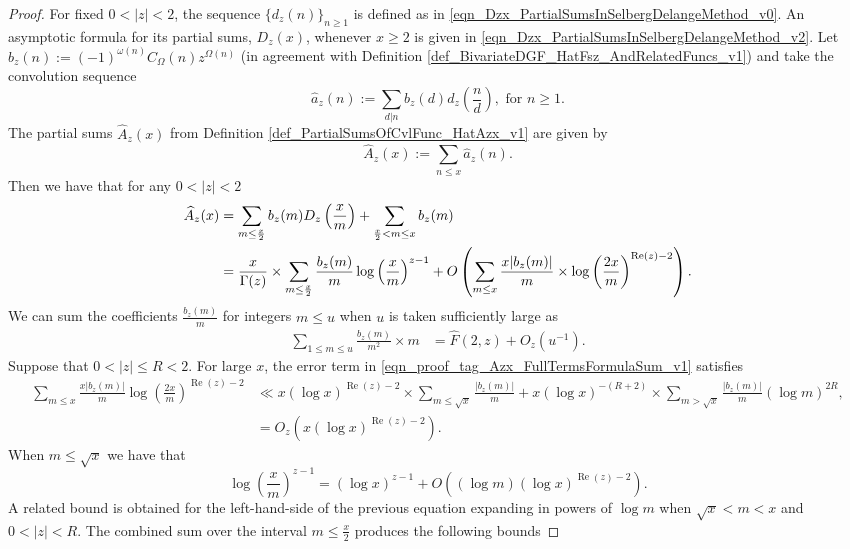 \documentclass[11pt,reqno,a4letter]{article}
\newcommand{\hlocalref}[1]{\hyperref[#1]{\ref{#1}}}
\numberwithin{equation}{section}
\numberwithin{figure}{section}
\numberwithin{table}{section}
\theoremstyle{plain}
\numberwithin{theorem}{section}
\theoremstyle{definition}
\renewcommand{\Re}{\operatorname{Re}}
\begin{document}
\begin{proof}
For fixed $0 < |z| < 2$, the sequence $\{d_z(n)\}_{n \geq 1}$ 
is defined as in \eqref{eqn_Dzx_PartialSumsInSelbergDelangeMethod_v0}. 
An asymptotic formula for its partial sums, $D_z(x)$, whenever $x \geq 2$ is given in 
\eqref{eqn_Dzx_PartialSumsInSelbergDelangeMethod_v2}. 
Let $b_z(n) := (-1)^{\omega(n)} C_{\Omega}(n) z^{\Omega(n)}$ (in agreement with 
Definition \hlocalref{def_BivariateDGF_HatFsz_AndRelatedFuncs_v1}) and  
take the convolution sequence 
$$\hat{a}_z(n) := \sum\limits_{d|n} b_z(d) d_z\left(\frac{n}{d}\right), \text{ for } n \geq 1.$$  
The partial sums $\widehat{A}_z(x)$ from 
Definition \hlocalref{def_PartialSumsOfCvlFunc_HatAzx_v1} are given by 
$$\widehat{A}_z(x) := \sum\limits_{n \leq x} \hat{a}_z(n).$$ 
Then we have that for any $0 < |z| < 2$ 
\begin{align} 
\notag 
\widehat{A}_z(x) & = \sum_{m \leq \frac{x}{2}} b_z(m) D_z\left(\frac{x}{m}\right) + 
     \sum_{\frac{x}{2} < m \leq x} b_z(m) \\ 
\label{eqn_proof_tag_Azx_FullTermsFormulaSum_v1} 
     & = \frac{x}{\Gamma(z)} \times \sum_{m \leq \frac{x}{2}} 
     \frac{b_z(m)}{m} \log\left(\frac{x}{m}\right)^{z-1} + 
     O\left(\sum_{m \leq x} \frac{x |b_z(m)|}{m} \times
     \log\left(\frac{2x}{m}\right)^{\Re(z) - 2}\right). 
\end{align} 
We can sum the coefficients $\frac{b_z(m)}{m}$ 
for integers $m \leq u$ when $u$ is taken sufficiently large as 
\begin{align*} 
\sum_{1 \leq m \leq u} \frac{b_z(m)}{m^2} \times m & = \widehat{F}(2, z) + O_z\left(u^{-1}\right). 
\end{align*} 
Suppose that $0 < |z| \leq R < 2$. 
For large $x$, the error term in \eqref{eqn_proof_tag_Azx_FullTermsFormulaSum_v1} satisfies 
\begin{align*} 
\sum_{m \leq x} \frac{x |b_z(m)|}{m} 
     \log\left(\frac{2x}{m}\right)^{\Re(z) - 2} & \ll 
     x (\log x)^{\Re(z) - 2} \times \sum_{m \leq \sqrt{x}} \frac{|b_z(m)|}{m} + 
     x (\log x)^{-(R+2)} \times \sum_{m > \sqrt{x}} \frac{|b_z(m)|}{m} (\log m)^{2R}, \\ 
     & = O_z\left(x (\log x)^{\Re(z) - 2}\right). 
\end{align*} 
When $m \leq \sqrt{x}$ we have that 
\[
\log\left(\frac{x}{m}\right)^{z-1} = (\log x)^{z-1} + 
     O\left((\log m) (\log x)^{\Re(z) - 2}\right). 
\]
A related bound is obtained for the left-hand-side of the previous equation 
expanding in powers of $\log m$ 
when $\sqrt{x} < m < x$ and $0 < |z| < R$. 
The combined sum over the interval $m \leq \frac{x}{2}$ produces the following bounds 

\end{proof}
\end{document}

